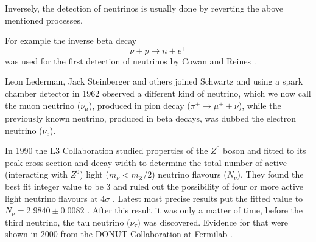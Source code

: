 Inversely, the detection of neutrinos is usually done by reverting the above mentioned processes.

For example the inverse beta decay
\begin{equation}
\nu +p\rightarrow n+e^+
\end{equation}
was used for the first detection of neutrinos by Cowan and Reines \cite{CowanReinesFirstAttempt.pdf, CowanReinesConfirmation.pdf}. 



Leon Lederman, Jack Steinberger and others joined Schwartz and using a spark chamber detector in 1962 observed\cite{MuonNeutrinoDetection.pdf} a different kind of neutrino, which we now call the muon neutrino ($\nu_{\mu}$), produced in pion decay ($\pi^{\pm}\rightarrow\mu^{\pm} +\nu$), while the previously known neutrino, produced in beta decays, was dubbed the electron neutrino ($\nu_e$).

In 1990 the L3 Collaboration studied properties of the $Z^0$ boson and fitted to its peak cross-section and decay width to determine the total number of active (interacting with $Z^0$) light ($m_{\nu}<m_{Z}/2$) neutrino flavours ($N_{\nu}$). They found the best fit integer value to be 3 and ruled out the possibility of four or more active light neutrino flavours at $4\sigma$ \cite{ZDecay.pdf}. Latest most precise results put the fitted value to $N_{\nu}=2.9840\pm 0.0082$ \cite{ZDecayPrecise.pdf}.
After this result it was only a matter of time, before the third neutrino, the tau neutrino ($\nu_{\tau}$) was discovered. Evidence for that were shown in 2000 from the DONUT Collaboration at Fermilab \cite{ObservationOfTauNeutrino.pdf}.

